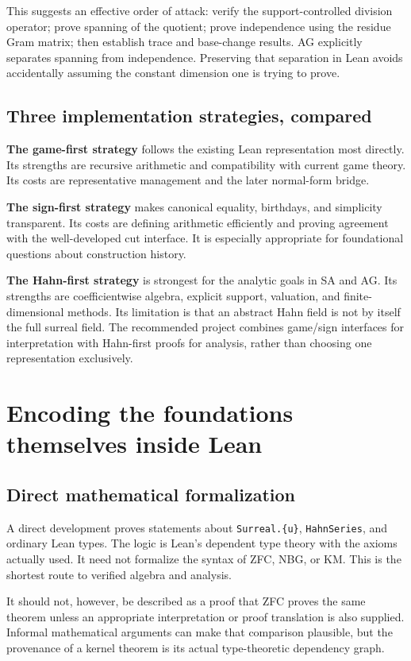 \documentclass[11pt,letterpaper]{article}
\theoremstyle{definition}
\theoremstyle{remark}
\numberwithin{equation}{section}
\begin{document}
This suggests an effective order of attack: verify the support-controlled division operator; prove spanning of the quotient; prove independence using the residue Gram matrix; then establish trace and base-change results. AG explicitly separates spanning from independence. Preserving that separation in Lean avoids accidentally assuming the constant dimension one is trying to prove.

\subsection{Three implementation strategies, compared}
\textbf{The game-first strategy} follows the existing Lean representation most directly. Its strengths are recursive arithmetic and compatibility with current game theory. Its costs are representative management and the later normal-form bridge.

\textbf{The sign-first strategy} makes canonical equality, birthdays, and simplicity transparent. Its costs are defining arithmetic efficiently and proving agreement with the well-developed cut interface. It is especially appropriate for foundational questions about construction history.

\textbf{The Hahn-first strategy} is strongest for the analytic goals in SA and AG. Its strengths are coefficientwise algebra, explicit support, valuation, and finite-dimensional methods. Its limitation is that an abstract Hahn field is not by itself the full surreal field. The recommended project combines game/sign interfaces for interpretation with Hahn-first proofs for analysis, rather than choosing one representation exclusively.

\section{Encoding the foundations themselves inside Lean}\label{sec:internal}

\subsection{Direct mathematical formalization}
A direct development proves statements about \texttt{Surreal.\{u\}}, \texttt{HahnSeries}, and ordinary Lean types. The logic is Lean's dependent type theory with the axioms actually used. It need not formalize the syntax of ZFC, NBG, or KM. This is the shortest route to verified algebra and analysis.

It should not, however, be described as a proof that ZFC proves the same theorem unless an appropriate interpretation or proof translation is also supplied. Informal mathematical arguments can make that comparison plausible, but the provenance of a kernel theorem is its actual type-theoretic dependency graph.
\end{document}
